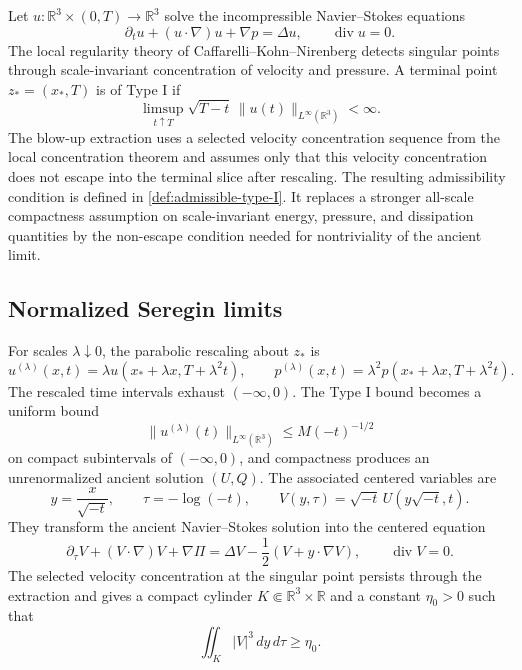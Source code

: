 \documentclass[11pt]{amsart}
\theoremstyle{plain}
\theoremstyle{definition}
\theoremstyle{remark}
\numberwithin{equation}{section}
\newcommand{\R}{\mathbb R}
\newcommand{\divergence}{\operatorname{div}}
\begin{document}
Let \(u:\R^3\times(0,T)\to\R^3\) solve the incompressible Navier--Stokes
equations
\begin{equation}\label{eq:NS}
   \partial_tu+(u\cdot\nabla)u+\nabla p=\Delta u,\qquad
   \divergence u=0.
\end{equation}
The local regularity theory of Caffarelli--Kohn--Nirenberg \cite{CKN1982}
detects singular points through scale-invariant concentration of velocity and
pressure.  A terminal point \(z_*=(x_*,T)\) is of Type I if
\begin{equation}\label{eq:type-I-bound}
   \limsup_{t\uparrow T}\sqrt{T-t}\,
   \|u(t)\|_{L^\infty(\R^3)}<\infty .
\end{equation}
The blow-up extraction uses a selected velocity concentration sequence from
the local concentration theorem and assumes only that this velocity
concentration does not escape into the terminal slice after rescaling.  The
resulting admissibility condition is defined in
\cref{def:admissible-type-I}.  It replaces a stronger all-scale compactness
assumption on scale-invariant energy, pressure, and dissipation quantities by
the non-escape condition needed for nontriviality of the ancient limit.

\subsection{Normalized Seregin limits}

For scales \(\lambda\downarrow0\), the parabolic rescaling about \(z_*\) is
\[
   u^{(\lambda)}(x,t)
   =
   \lambda u(x_*+\lambda x,T+\lambda^2t),\qquad
   p^{(\lambda)}(x,t)
   =
   \lambda^2p(x_*+\lambda x,T+\lambda^2t).
\]
The rescaled time intervals exhaust \((-\infty,0)\).  The Type I bound
becomes a uniform bound
\[
   \|u^{(\lambda)}(t)\|_{L^\infty(\R^3)}
   \le M(-t)^{-1/2}
\]
on compact subintervals of \((-\infty,0)\), and compactness produces an
unrenormalized ancient solution \((U,Q)\).  The associated centered variables
are
\[
   y=\frac{x}{\sqrt{-t}},\qquad
   \tau=-\log(-t),\qquad
   V(y,\tau)=\sqrt{-t}\,U(y\sqrt{-t},t).
\]
They transform the ancient Navier--Stokes solution into the centered equation
\begin{equation}\label{eq:centered}
   \partial_\tau V+(V\cdot\nabla)V+\nabla\Pi
   =
   \Delta V-\frac12(V+y\cdot\nabla V),
   \qquad \divergence V=0.
\end{equation}
The selected velocity concentration at the singular point persists through
the extraction and gives a compact cylinder \(K\Subset\R^3\times\R\) and a
constant \(\eta_0>0\) such that
\begin{equation}\label{eq:nonvanishing}
   \iint_K |V|^3\,dy\,d\tau\ge\eta_0 .
\end{equation}
\end{document}
